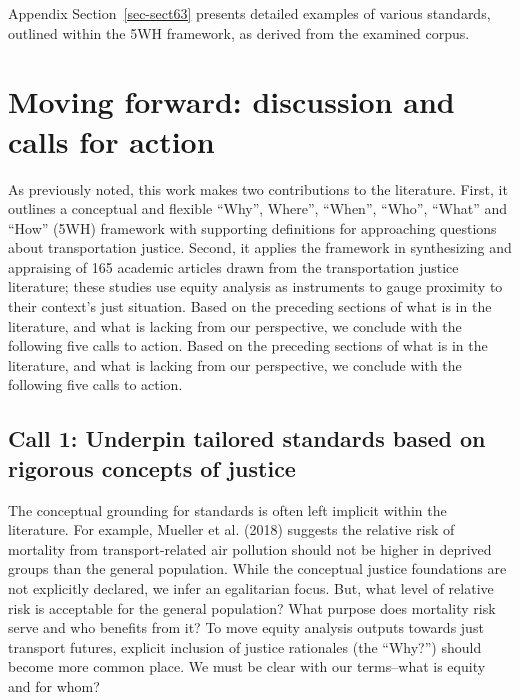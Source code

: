\documentclass[
  letterpaper,
  DIV=11,
  numbers=noendperiod]{scrartcl}
\begin{document}
Appendix Section~\ref{sec-sect63} presents detailed examples of various
standards, outlined within the 5WH framework, as derived from the
examined corpus.

\section{Moving forward: discussion and calls for
action}\label{moving-forward-discussion-and-calls-for-action}

As previously noted, this work makes two contributions to the
literature. First, it outlines a conceptual and flexible ``Why'',
Where'', ``When'', ``Who'', ``What'' and ``How'' (5WH) framework with
supporting definitions for approaching questions about transportation
justice. Second, it applies the framework in synthesizing and appraising
of 165 academic articles drawn from the transportation justice
literature; these studies use equity analysis as instruments to gauge
proximity to their context's just situation. Based on the preceding
sections of what is in the literature, and what is lacking from our
perspective, we conclude with the following five calls to action. Based
on the preceding sections of what is in the literature, and what is
lacking from our perspective, we conclude with the following five calls
to action.

\subsection{Call 1: Underpin tailored standards based on rigorous
concepts of
justice}\label{call-1-underpin-tailored-standards-based-on-rigorous-concepts-of-justice}

The conceptual grounding for standards is often left implicit within the
literature. For example, Mueller et al. (2018) suggests the relative
risk of mortality from transport-related air pollution should not be
higher in deprived groups than the general population. While the
conceptual justice foundations are not explicitly declared, we infer an
egalitarian focus. But, what level of relative risk is acceptable for
the general population? What purpose does mortality risk serve and who
benefits from it? To move equity analysis outputs towards just transport
futures, explicit inclusion of justice rationales (the ``Why?'') should
become more common place. We must be clear with our terms--what is
equity and for whom?
\end{document}
